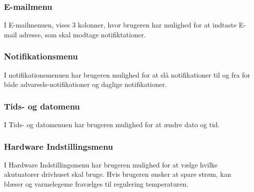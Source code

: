 \subsubsection{E-mailmenu}
I E-mailmenuen, vises 3 kolonner, hvor brugeren har mulighed for at indtaste E-mail adresse, som skal modtage notifiktationer. 

\subsubsection{Notifikationsmenu} 
I notifikationsmenuen har brugeren mulighed for at slå notifikationer til og fra for både advarsels-notifikationer og daglige notifikationer. 

\subsubsection{Tids- og datomenu} 
I Tids- og datomenuen har brugeren mulighed for at ændre dato og tid. 

\subsubsection{Hardware Indstillingsmenu} 
I Hardware Indstillingsmenu har brugeren mulighed for at vælge hvilke akutuatorer drivhuset skal bruge. Hvis brugeren ønsker at spare strøm, kan blæser og varmelegeme fravælges til regulering temperaturen. \\
